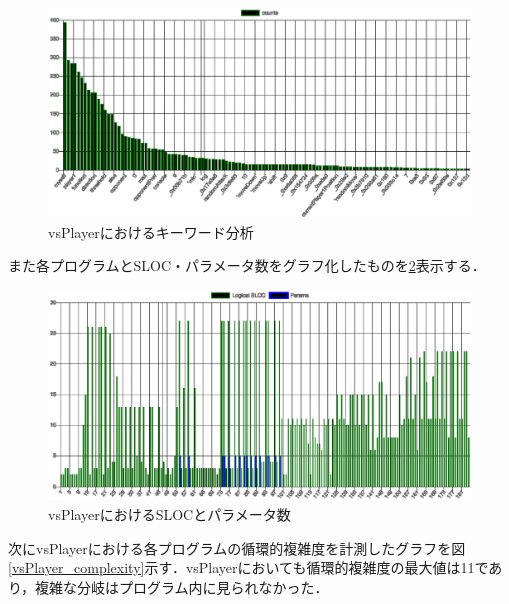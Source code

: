 \begin{figure}[!ht]
  \begin{center}
    \includegraphics[width=1.0\linewidth]{image/vsPlayer_result.eps}
  \end{center}
    \vspace{-8mm} 
  \caption{vsPlayerにおけるキーワード分析}
  \label{vsPlayer_keyword}
\end{figure}

また各プログラムとSLOC・パラメータ数をグラフ化したものを\ref{vsPlayer_sloc_and_params}表示する．

\begin{figure}[!ht]
  \begin{center}
    \includegraphics[width=1.0\linewidth]{image/vsPlayer_escomplex_SLOC_params.eps}
  \end{center}
    \vspace{-8mm} 
  \caption{vsPlayerにおけるSLOCとパラメータ数}
  \label{vsPlayer_sloc_and_params}
\end{figure}

次にvsPlayerにおける各プログラムの循環的複雑度を計測したグラフを図\ref{vsPlayer_complexity}示す．vsPlayerにおいても循環的複雑度の最大値は11であり，複雑な分岐はプログラム内に見られなかった．

